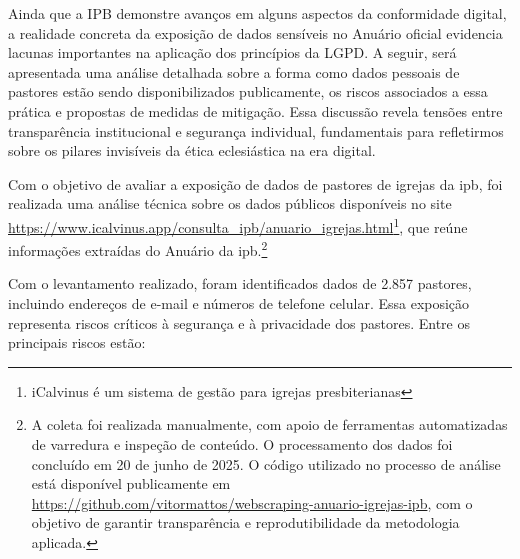 Ainda que a IPB demonstre avanços em alguns aspectos da conformidade digital, a realidade concreta da exposição de dados sensíveis no Anuário oficial evidencia lacunas importantes na aplicação dos princípios da LGPD. A seguir, será apresentada uma análise detalhada sobre a forma como dados pessoais de pastores estão sendo disponibilizados publicamente, os riscos associados a essa prática e propostas de medidas de mitigação. Essa discussão revela tensões entre transparência institucional e segurança individual, fundamentais para refletirmos sobre os pilares invisíveis da ética eclesiástica na era digital.

Com o objetivo de avaliar a exposição de dados de pastores de igrejas da \gls{ipb}, foi realizada uma análise técnica sobre os dados públicos disponíveis no site \url{https://www.icalvinus.app/consulta_ipb/anuario_igrejas.html}\footnote{iCalvinus é um sistema de gestão para igrejas presbiterianas}, que reúne informações extraídas do Anuário da \gls{ipb}.\footnote{A coleta foi realizada manualmente, com apoio de ferramentas automatizadas de varredura e inspeção de conteúdo. O processamento dos dados foi concluído em 20 de junho de 2025. O código utilizado no processo de análise está disponível publicamente em \url{https://github.com/vitormattos/webscraping-anuario-igrejas-ipb}, com o objetivo de garantir transparência e reprodutibilidade da metodologia aplicada.}

Com o levantamento realizado, foram identificados dados de 2.857 pastores, incluindo endereços de e-mail e números de telefone celular. Essa exposição representa riscos críticos à segurança e à privacidade dos pastores. Entre os principais riscos estão:

